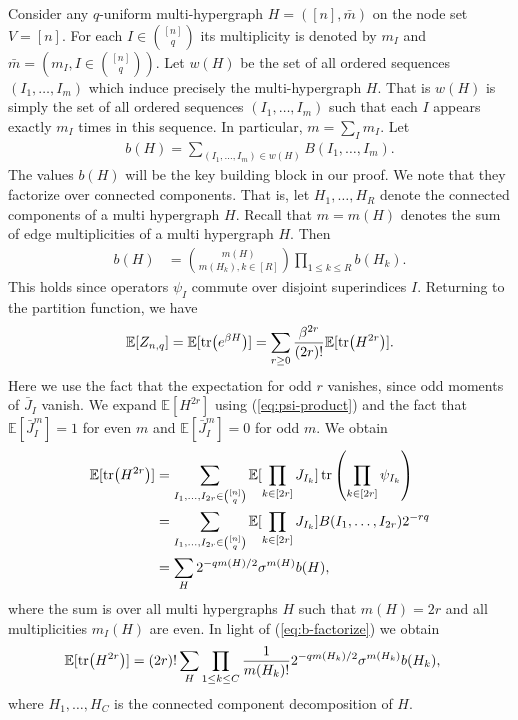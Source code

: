 \documentclass[12pt]{article}
\newcommand{\E}{\mathbb{E}}
\begin{document}
Consider any $q$-uniform multi-hypergraph $H=([n],\bar m)$ on the node set $V=[n]$. For each $I\in \binom{[n]}{q}$ its multiplicity is denoted by $m_I$
and $\bar m=(m_I, I\in \binom{[n]}{q})$.
Let $w(H)$ be the set of all ordered sequences $(I_1,\ldots,I_m)$ which induce precisely the multi-hypergraph $H$. That is $w(H)$
is simply the set of all ordered sequences $(I_1,\ldots,I_m)$ such that each $I$ appears exactly $m_I$ times in this sequence.
In particular, $m=\sum_I m_I$. Let 
\begin{align}
b(H)=\sum_{(I_1,\ldots,I_m)\in w(H)}  B(I_1,\ldots,I_m). \label{eq:B(H)}
\end{align}
The values  $b(H)$   will be the key building block in our proof. We note that they factorize
over connected components. That is, let $H_1,\ldots,H_R$ denote the connected components of a multi hypergraph $H$.
Recall that $m=m(H)$ denotes the  sum of edge multiplicities of a multi hypergraph $H$. Then
\begin{align}
b(H) &={m(H) \choose m(H_k) , k\in [R]}\prod_{1\le k\le R} b(H_k). \label{eq:b-factorize}
\end{align}
This holds since operators $\psi_I$ commute  over disjoint superindices $I$.
Returning to the partition function,  we have
\begin{align*}
\E[Z_{n,q}]  = \E[\tr(e^{\beta H})] = \sum_{r \geq 0} \frac{\beta^{2r}}{(2r)!} \E[\tr(H^{2r})].
\end{align*}
Here we use the fact that the expectation for odd $r$ vanishes, since odd moments of $\bar J_I$  vanish. We expand $ \E[H^{2r}]$ using  (\ref{eq:psi-product}) 
and the fact that $\E[\bar J_I^m]=1$ for even $m$ and $\E[\bar J_I^m]=0$  for odd $m$. We obtain 
\begin{align*}
\E[\tr(H^{2r})]&=\sum_{I_1,\ldots,I_{2r}\in \binom{[n]}{q}}\E[\prod_{k\in [2r]}J_{I_k}]\tr\left(\prod_{k\in [2r]}\psi_{I_k}\right) \\
&= \sum_{I_1,\ldots,I_{2r}\in \binom{[n]}{q}}\E[\prod_{k\in [2r]} J_{I_k}]B(I_1,\ldots,I_{2r}) 2^{-r q} \\
&= \sum_H 2^{-q m(H)/2}\sigma^{m(H)}b(H),
\end{align*}
where the sum is over all multi hypergraphs $H$ such that  $m(H)=2r$ and all multiplicities
$m_I(H)$ are even. 
In light of  (\ref{eq:b-factorize})   we obtain
\begin{align*}
\E[\tr(H^{2r})]&= (2r)!\sum_H\prod_{1\le k\le C} {1\over  m(H_k)  ! }2^{-q m(H_k)/2}\sigma^{m(H_k)}b(H_k),
\end{align*}
where $H_1,\ldots,H_C$ is the connected component decomposition of $H$.
\end{document}
